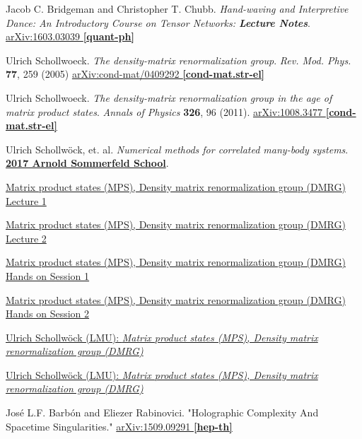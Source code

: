 \documentclass[10pt]{amsart}
\begin{document}
\begin{thebibliography}{9}
Jacob C. Bridgeman and Christopher T. Chubb.  \emph{Hand-waving and Interpretive Dance: An Introductory Course on Tensor Networks: \textbf{Lecture Notes}}.  \href{https://arxiv.org/abs/1603.03039}{arXiv:1603.03039 \textbf{[quant-ph]}}

Ulrich Schollwoeck.  \emph{The density-matrix renormalization group}.   \emph{Rev. Mod. Phys.} \textbf{77}, 259 (2005)	\href{https://arxiv.org/abs/cond-mat/0409292}{arXiv:cond-mat/0409292 \textbf{[cond-mat.str-el]}}

Ulrich Schollwoeck.  \emph{The density-matrix renormalization group in the age of matrix product states}.  \emph{Annals of Physics} \textbf{326}, 96 (2011).  \href{https://arxiv.org/abs/1008.3477}{arXiv:1008.3477 \textbf{[cond-mat.str-el]}}

Ulrich Schollw\"{o}ck, et. al. \emph{Numerical methods for correlated many-body systems}. \href{https://www.asc.physik.lmu.de/activities/schools/archiv/asc_school_17/index.html}{\textbf{2017 Arnold Sommerfeld School}}. 

\href{https://cast.itunes.uni-muenchen.de/clips/WE0Gf4L6f3/vod/high_quality.mp4}{Matrix product states (MPS), Density matrix renormalization group (DMRG) Lecture 1} 

\href{https://cast.itunes.uni-muenchen.de/clips/1PTFIT1n42/vod/high_quality.mp4}{Matrix product states (MPS), Density matrix renormalization group (DMRG) Lecture 2} 

\href{https://cast.itunes.uni-muenchen.de/clips/uN8yxWC8m9/vod/high_quality.mp4}{Matrix product states (MPS), Density matrix renormalization group (DMRG) Hands on Session 1} 

\href{https://cast.itunes.uni-muenchen.de/clips/xJRe4DD7Fo/vod/high_quality.mp4}{Matrix product states (MPS), Density matrix renormalization group (DMRG) Hands on Session 2} 

\href{https://www.asc.physik.lmu.de/activities/schools/archiv/asc_school_17/extramaterial/schollwoeck_asc_1.pdf}{Ulrich Schollw\"{o}ck (LMU): \emph{Matrix product states (MPS), Density matrix renormalization group (DMRG)}}

\href{https://www.asc.physik.lmu.de/activities/schools/archiv/asc_school_17/extramaterial/schollwoeck_asc_2.pdf}{Ulrich Schollw\"{o}ck (LMU): \emph{Matrix product states (MPS), Density matrix renormalization group (DMRG)}}


Jos\'{e} L.F. Barb\'{o}n and Eliezer Rabinovici.  "Holographic Complexity And Spacetime Singularities."  \href{https://arxiv.org/abs/1509.09291v3}{arXiv:1509.09291 \textbf{[hep-th]}}


\end{thebibliography}
\end{document}
